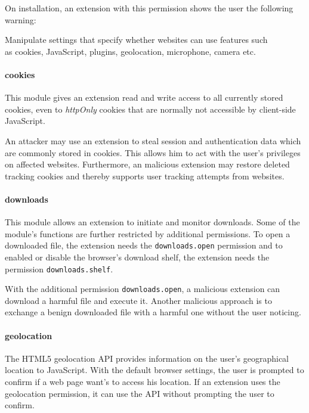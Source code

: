 	On installation, an extension with this permission shows the user the following warning:
	\begin{permissionwarning}
		Manipulate settings that specify whether websites can use features such\\as cookies, JavaScript, plugins, geolocation, microphone, camera etc.
	\end{permissionwarning}
	
\paragraph{cookies} 
	This module gives an extension read and write access to all currently stored cookies, even to \textit{httpOnly} cookies that are normally not accessible by client-side JavaScript.
	
	An attacker may use an extension to steal session and authentication data which are commonly stored in cookies. This allows him to act with the user's privileges on affected websites. Furthermore, an malicious extension may restore deleted tracking cookies and thereby supports user tracking attempts from websites.
	
\paragraph{downloads} 
	This module allows an extension to initiate and monitor downloads. Some of the module's functions are further restricted by additional permissions. To open a downloaded file, the extension needs the \texttt{downloads.open} permission and to enabled or disable the browser's download shelf, the extension needs the permission \texttt{downloads.shelf}.  
	
	With the additional permission \texttt{downloads.open}, a malicious extension can download a harmful file and execute it. Another malicious approach is to exchange a benign downloaded file with a harmful one without the user noticing. 
	
\paragraph{geolocation}
	The HTML5 geolocation API provides information on the user's geographical location to JavaScript. With the default browser settings, the user is prompted to confirm if a web page want's to access his location. If an extension uses the geolocation permission, it can use the API without prompting the user to confirm.
	
